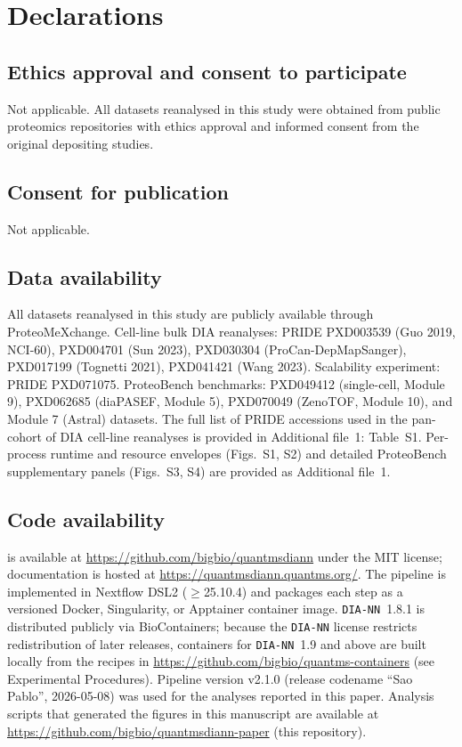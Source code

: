 \section*{Declarations}

\subsection*{Ethics approval and consent to participate}
Not applicable.
All datasets reanalysed in this study were obtained from public proteomics repositories with ethics approval and informed consent from the original depositing studies.

\subsection*{Consent for publication}
Not applicable.

\subsection*{Data availability}
All datasets reanalysed in this study are publicly available through ProteoMeXchange.
Cell-line bulk DIA reanalyses: PRIDE PXD003539 (Guo 2019, NCI-60), PXD004701 (Sun 2023), PXD030304 (ProCan-DepMapSanger), PXD017199 (Tognetti 2021), PXD041421 (Wang 2023).
Scalability experiment: PRIDE PXD071075.
ProteoBench benchmarks: PXD049412 (single-cell, Module 9), PXD062685 (diaPASEF, Module 5), PXD070049 (ZenoTOF, Module 10), and Module 7 (Astral) datasets.
The full list of PRIDE accessions used in the pan-cohort of DIA cell-line reanalyses is provided in Additional file~1: Table~S1.
Per-process runtime and resource envelopes (Figs.~S1, S2) and detailed ProteoBench supplementary panels (Figs.~S3, S4) are provided as Additional file~1.

\subsection*{Code availability}
\quantmsdiann{} is available at \url{https://github.com/bigbio/quantmsdiann} under the MIT license; documentation is hosted at \url{https://quantmsdiann.quantms.org/}.
The pipeline is implemented in Nextflow DSL2 ($\geq$25.10.4) and packages each step as a versioned Docker, Singularity, or Apptainer container image.
\texttt{DIA-NN}~1.8.1 is distributed publicly via BioContainers; because the \texttt{DIA-NN} license restricts redistribution of later releases, containers for \texttt{DIA-NN}~1.9 and above are built locally from the recipes in \url{https://github.com/bigbio/quantms-containers} (see Experimental Procedures).
Pipeline version v2.1.0 (release codename ``Sao Pablo'', 2026-05-08) was used for the analyses reported in this paper.
Analysis scripts that generated the figures in this manuscript are available at \url{https://github.com/bigbio/quantmsdiann-paper} (this repository).

